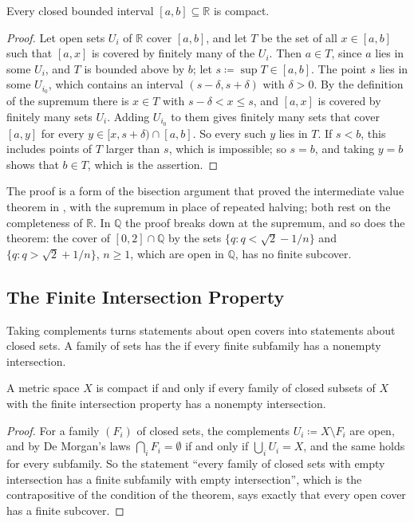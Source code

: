 \begin{theorem}
\label{thm:interval-compact}
Every closed bounded interval $[a,b]\subseteq\mathbb R$ is compact.
\end{theorem}

\begin{proof}
Let open sets $U_i$ of $\mathbb R$ cover $[a,b]$, and let $T$ be the set of all $x\in[a,b]$ such that $[a,x]$ is covered by finitely many of the $U_i$. Then $a\in T$, since $a$ lies in some $U_i$, and $T$ is bounded above by $b$; let $s\coloneqq\sup T\in[a,b]$. The point $s$ lies in some $U_{i_0}$, which contains an interval $(s-\delta,s+\delta)$ with $\delta>0$. By the definition of the supremum there is $x\in T$ with $s-\delta<x\le s$, and $[a,x]$ is covered by finitely many sets $U_i$. Adding $U_{i_0}$ to them gives finitely many sets that cover $[a,y]$ for every $y\in[x,s+\delta)\cap[a,b]$. So every such $y$ lies in $T$. If $s<b$, this includes points of $T$ larger than $s$, which is impossible; so $s=b$, and taking $y=b$ shows that $b\in T$, which is the assertion.
\end{proof}

The proof is a form of the bisection argument that proved the intermediate value theorem in , with the supremum in place of repeated halving; both rest on the completeness of $\mathbb R$. In $\mathbb Q$ the proof breaks down at the supremum, and so does the theorem: the cover of $[0,2]\cap\mathbb Q$ by the sets $\{q: q<\sqrt2-1/n\}$ and $\{q: q>\sqrt2+1/n\}$, $n\ge1$, which are open in $\mathbb Q$, has no finite subcover.

\subsection{The Finite Intersection Property}

Taking complements turns statements about open covers into statements about closed sets. A family of sets has the  if every finite subfamily has a nonempty intersection.

\begin{theorem}
\label{thm:fip}
A metric space $X$ is compact if and only if every family of closed subsets of $X$ with the finite intersection property has a nonempty intersection.
\end{theorem}

\begin{proof}
For a family $(F_i)$ of closed sets, the complements $U_i\coloneqq X\setminus F_i$ are open, and by De Morgan's laws $\bigcap_iF_i=\emptyset$ if and only if $\bigcup_iU_i=X$, and the same holds for every subfamily. So the statement ``every family of closed sets with empty intersection has a finite subfamily with empty intersection'', which is the contrapositive of the condition of the theorem, says exactly that every open cover has a finite subcover.
\end{proof}


